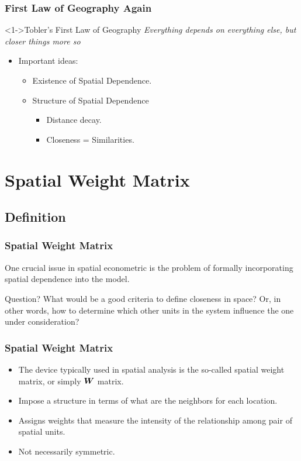 \documentclass[english,10pt]{beamer}\usepackage[]{graphicx}\usepackage[]{xcolor}
\begin{document}
\begin{frame}
  \frametitle{First Law of Geography Again}
    \begin{alertblock}<1->{Tobler's First Law of Geography}
      \emph{Everything depends on everything else, but closer things more so}
    \end{alertblock}
    
    \begin{itemize}[<+->]
      \item Important ideas:
        \begin{itemize}
          \item \alert{Existence} of Spatial Dependence.
          \item \alert{Structure} of Spatial Dependence
            \begin{itemize}
              \item Distance decay.
              \item Closeness =  Similarities.
            \end{itemize}
        \end{itemize}
    \end{itemize}
\end{frame}


\section{Spatial Weight Matrix}

\subsection{Definition}

\begin{frame}
  \frametitle{Spatial Weight Matrix}
One crucial issue in spatial econometric is the problem of formally incorporating spatial dependence into the model.
  
  \pause  
  \begin{alertblock}{Question?}
  What would be a good criteria to define closeness in space? Or, in other words, how to determine which other units in the system influence the one under consideration?
  \end{alertblock}

\end{frame}

\begin{frame}
  \frametitle{Spatial Weight Matrix}
    \begin{itemize}
      \item The device typically used in spatial analysis is the so-called \alert{spatial weight matrix}, or simply $\bm W$ matrix.
      \item Impose a \alert{structure} in terms of what are the \alert{neighbors} for each location.
      \item Assigns \alert{weights} that measure the \alert{intensity of the relationship} among pair of spatial units.
      \item Not necessarily \alert{symmetric}.
    \end{itemize}
\end{frame}
\end{document}
